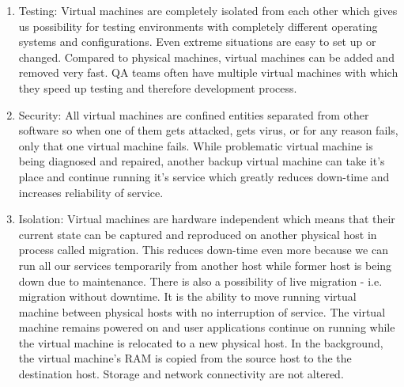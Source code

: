 \begin{enumerate}
\item Testing: Virtual machines are completely isolated from each other which gives us possibility for testing environments with completely different operating systems and configurations. Even extreme situations are easy to set up or changed. Compared to physical machines, virtual machines can be added and removed very fast. QA teams often have multiple virtual machines with which they speed up testing and therefore development process.
\item Security: All virtual machines are confined entities separated from other software so when one of them gets attacked, gets virus, or for any reason fails, only that one virtual machine fails. While problematic virtual machine is being diagnosed and repaired, another backup virtual machine can take it's place and continue running it's service which greatly reduces down-time and increases reliability of service.
\item \label{live-migration} Isolation: Virtual machines are hardware independent which means that their current state can be captured and reproduced on another physical host in process called migration. This reduces down-time even more because we can run all our services temporarily from another host while former host is being down due to maintenance. There is also a possibility of live migration - i.e. migration without downtime. It is the ability to move running virtual machine between physical hosts with no interruption of service. The virtual machine remains powered on and user applications continue on running while the virtual machine is relocated to a new physical host. In the background, the virtual machine's RAM is copied from the source host to the the destination host. Storage and network connectivity are not altered.
\end{enumerate}

